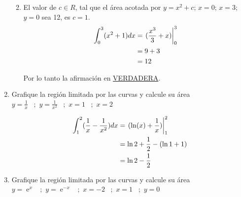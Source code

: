 \documentclass[letterpaper,10pt]{article}
\newcommand{\dis}{\displaystyle}
\def\e{\operatorname{e}}
\begin{document}
\begin{enumerate}
\begin{enumerate}[label=\emph{\alph*)}]
\newpage
\item El valor de $c \in R$, tal que el área acotada por $y = x^2+c$; $x=0$; $x=3$; $y=0$ sea 12, es $c=1$.\\

\begin{align*}
\dis \int_0^3 (x^2 +1)dx &= \displaystyle   \left.(\frac{x^3}{3}+x)\right|_{0}^{3}\\
\dis  &= 9+3\\
\dis  &= 12
\end{align*}

Por lo tanto la afirmación en \underline{VERDADERA}.

\newpage

\end{enumerate}

\item Grafique la regi\'{o}n  limitada por las curvas y calcule su \'{a}rea\\
$\dis y=\frac{1}{x}$ \, ;\,  $\dis y=\frac{1}{x^2}$ \, ;\, $x=1$ \, ;\, $x=2$

\begin{figure}[!htb]\centering
   \begin{minipage}{0.6\textwidth}
     
   \end{minipage}
   \begin {minipage}{0.3\textwidth}
     
   \end{minipage}
\end{figure}

\begin{align*}
\dis \int_1^2 (\frac{1}{x}- \frac{1}{x^2})dx &= \displaystyle   \left.(\ln (x)+\frac{1}{x})\right|_{1}^{2}\\
\dis  &= \ln 2 + \frac{1}{2} - (\ln 1 + 1)\\
\dis  &= \ln 2 - \frac{1}{2}
\end{align*}

\item Grafique la regi\'{o}n  limitada por las curvas y calcule su \'{a}rea\\
$\dis y=\e^x$ \, ;\,  $\dis y=\e^{-x}$ \, ;\, $x=-2$ \, ;\, $x=1$ \, ;\,  $\dis y=0$


\begin{figure}[!htb]\centering
   \begin{minipage}{0.6\textwidth}
     

\end{minipage}
\end{figure}
\end{enumerate}
\end{document}
